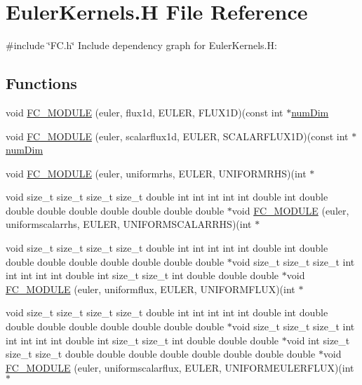 \hypertarget{EulerKernels_8H}{}\section{Euler\+Kernels.\+H File Reference}
\label{EulerKernels_8H}
{\ttfamily \#include \char`\"{}F\+C.\+h\char`\"{}}\newline
Include dependency graph for Euler\+Kernels.\+H\+:
\subsection*{Functions}
\begin{DoxyCompactItemize}
\item 
void \hyperlink{EulerKernels_8H_a7812aa3c1b33953dbf982a92429213e8}{F\+C\+\_\+\+M\+O\+D\+U\+LE} (euler, flux1d, E\+U\+L\+ER, F\+L\+U\+X1D)(const int $\ast$\hyperlink{SATKernels_8H_a680185db8546de161968dabace9e94f1}{num\+Dim}
\item 
void \hyperlink{EulerKernels_8H_ab40e9a3a880a341a28756de4fca96e9e}{F\+C\+\_\+\+M\+O\+D\+U\+LE} (euler, scalarflux1d, E\+U\+L\+ER, S\+C\+A\+L\+A\+R\+F\+L\+U\+X1D)(const int $\ast$\hyperlink{SATKernels_8H_a680185db8546de161968dabace9e94f1}{num\+Dim}
\item 
void \hyperlink{EulerKernels_8H_aad08baf809ba587debd251c64396f241}{F\+C\+\_\+\+M\+O\+D\+U\+LE} (euler, uniformrhs, E\+U\+L\+ER, U\+N\+I\+F\+O\+R\+M\+R\+HS)(int $\ast$
\item 
void size\+\_\+t size\+\_\+t size\+\_\+t size\+\_\+t double int int int int int double int double double double double double double double double $\ast$void \hyperlink{EulerKernels_8H_a47ef30eedb5748843ea14cae8bb78001}{F\+C\+\_\+\+M\+O\+D\+U\+LE} (euler, uniformscalarrhs, E\+U\+L\+ER, U\+N\+I\+F\+O\+R\+M\+S\+C\+A\+L\+A\+R\+R\+HS)(int $\ast$
\item 
void size\+\_\+t size\+\_\+t size\+\_\+t size\+\_\+t double int int int int int double int double double double double double double double double $\ast$void size\+\_\+t size\+\_\+t size\+\_\+t int int int int int double int size\+\_\+t size\+\_\+t int double double double $\ast$void \hyperlink{EulerKernels_8H_ac853d92c33d648f5573460c374b7da43}{F\+C\+\_\+\+M\+O\+D\+U\+LE} (euler, uniformflux, E\+U\+L\+ER, U\+N\+I\+F\+O\+R\+M\+F\+L\+UX)(int $\ast$
\item 
void size\+\_\+t size\+\_\+t size\+\_\+t size\+\_\+t double int int int int int double int double double double double double double double double $\ast$void size\+\_\+t size\+\_\+t size\+\_\+t int int int int int double int size\+\_\+t size\+\_\+t int double double double $\ast$void int size\+\_\+t size\+\_\+t size\+\_\+t double double double double double double double double $\ast$void \hyperlink{EulerKernels_8H_a76304b605c9fd388cb9b1e752199a9d2}{F\+C\+\_\+\+M\+O\+D\+U\+LE} (euler, uniformscalarflux, E\+U\+L\+ER, U\+N\+I\+F\+O\+R\+M\+E\+U\+L\+E\+R\+F\+L\+UX)(int $\ast$
\end{DoxyCompactItemize}
